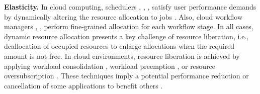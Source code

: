 \noindent \textbf{Elasticity.}
In cloud computing, schedulers  \cite{verma2015large}, \cite{burns2016borg},
\cite{armbrust2009above},  satisfy user performance demands 
by dynamically altering the resource allocation to jobs \cite{mell2011nist}.
Also, cloud workflow managers \cite{vavilapalli2013apache},
\cite{kulkarni2015twitter}, perform fine-grained allocation for each workflow stage.
In all cases, dynamic resource allocation presents a key challenge of
resource liberation, i.e., deallocation of occupied resources to enlarge 
allocations when the required amount is not free.
In cloud environments, resource liberation is achieved by
applying workload consolidation \cite{srikantaiah2008energy},
workload preemption \cite{verma2015large},
or resource oversubscription \cite{tomas2013improving}.
These techniques imply a potential performance reduction
or cancellation of some applications to benefit others \cite{sharma2011cost}.


